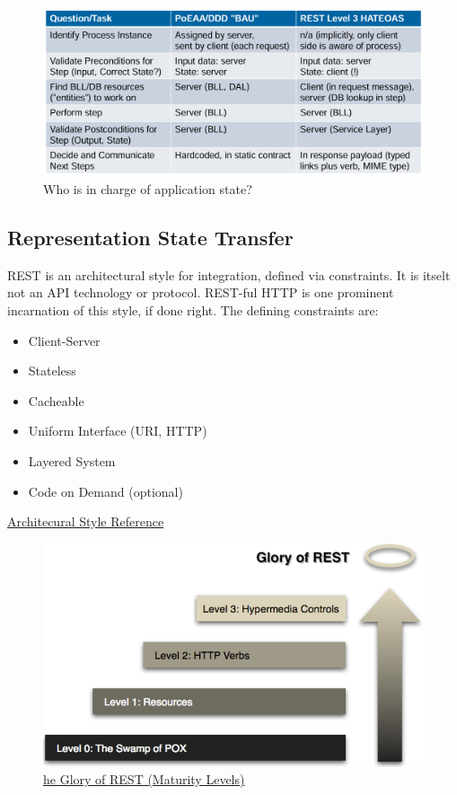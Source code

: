 \documentclass[../Main.tex]{subfiles}
\begin{document}
\begin{figure}[H]
    \centering
    \includegraphics[width=0.75\linewidth]{Images/app-state-management.png}
    \caption{Who is in charge of application state?}
\end{figure}

\subsection{Representation State Transfer}
REST is an architectural style for integration, defined via constraints.
It is itselt not an API technology or protocol. REST-ful HTTP is one prominent incarnation of this style, if done right.
The defining constraints are:
\begin{itemize}
    \item Client-Server
    \item Stateless
    \item Cacheable
    \item Uniform Interface (URI, HTTP)
    \item Layered System
    \item Code on Demand (optional)
\end{itemize}
\href{http://www.ics.uci.edu/~fielding/pubs/dissertation/rest_arch_style.htm}{Architecural Style Reference}

\begin{figure}[H]
    \centering
    \includegraphics[width=0.75\linewidth]{Images/glory-of-rest.png}
    \caption{\href{https://martinfowler.com/articles/richardsonMaturityModel.htmlT}{he Glory of REST (Maturity Levels)}}
\end{figure}
\end{document}
